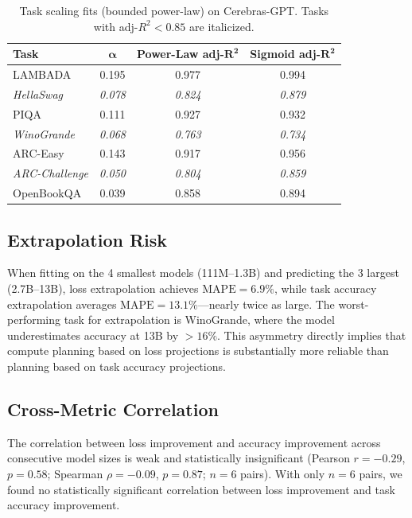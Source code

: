 \documentclass[11pt]{article}
\begin{document}
\begin{table}[h]
\centering
\small
\caption{Task scaling fits (bounded power-law) on Cerebras-GPT. Tasks with adj-$R^2 < 0.85$ are italicized.}
\label{tab:task}
\begin{tabular}{lccc}
\toprule
\textbf{Task} & $\boldsymbol{\alpha}$ & \textbf{Power-Law adj-}$\boldsymbol{R^2}$ & \textbf{Sigmoid adj-}$\boldsymbol{R^2}$ \\
\midrule
LAMBADA        & 0.195 & 0.977 & 0.994 \\
\emph{HellaSwag}      & \emph{0.078} & \emph{0.824} & \emph{0.879} \\
PIQA           & 0.111 & 0.927 & 0.932 \\
\emph{WinoGrande}     & \emph{0.068} & \emph{0.763} & \emph{0.734} \\
ARC-Easy       & 0.143 & 0.917 & 0.956 \\
\emph{ARC-Challenge}  & \emph{0.050} & \emph{0.804} & \emph{0.859} \\
OpenBookQA     & 0.039 & 0.858 & 0.894 \\
\bottomrule
\end{tabular}
\end{table}

\subsection{Extrapolation Risk}

When fitting on the 4 smallest models (111M--1.3B) and predicting the 3 largest (2.7B--13B), loss extrapolation achieves $\mathrm{MAPE} = 6.9\%$, while task accuracy extrapolation averages $\mathrm{MAPE} = 13.1\%$---nearly twice as large.
The worst-performing task for extrapolation is WinoGrande, where the model underestimates accuracy at 13B by $>16\%$.
This asymmetry directly implies that compute planning based on loss projections is substantially more reliable than planning based on task accuracy projections.

\subsection{Cross-Metric Correlation}

The correlation between loss improvement and accuracy improvement across consecutive model sizes is weak and statistically insignificant (Pearson $r = -0.29$, $p = 0.58$; Spearman $\rho = -0.09$, $p = 0.87$; $n = 6$ pairs).
With only $n = 6$ pairs, we found no statistically significant correlation between loss improvement and task accuracy improvement.
\end{document}
